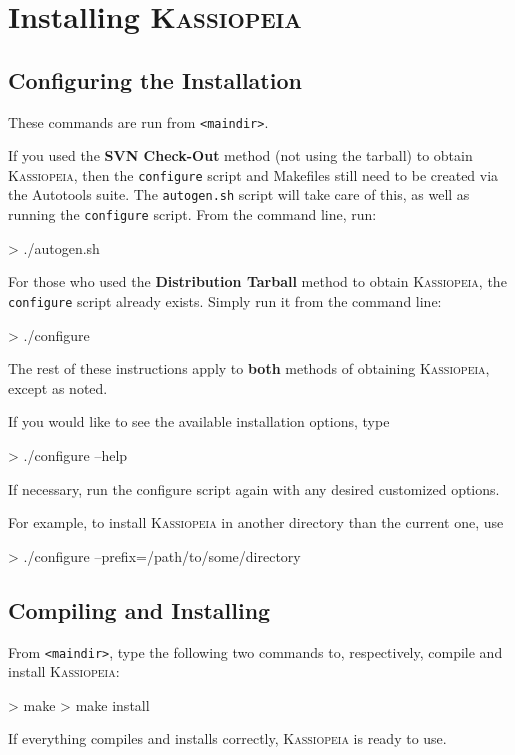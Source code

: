 \section{Installing \textsc{Kassiopeia}}

\subsection{Configuring the Installation}
These commands are run from \texttt{<maindir>}.

If you used the \textbf{SVN Check-Out} method (not using the tarball) to obtain \textsc{Kassiopeia}, then the \texttt{configure} script and Makefiles still need to be created via the Autotools suite.  The \texttt{autogen.sh} script will take care of this, as well as running the \texttt{configure} script.  From the command line, run:
\begin{DoxyCode}
>  ./autogen.sh
\end{DoxyCode}

For those who used the \textbf{Distribution Tarball} method to obtain \textsc{Kassiopeia}, the \texttt{configure} script already exists.  Simply run it from the command line:
\begin{DoxyCode}
>  ./configure
\end{DoxyCode}

The rest of these instructions apply to \textbf{both} methods of obtaining \textsc{Kassiopeia}, except as noted.

If you would like to see the available installation options, type
\begin{DoxyCode}
>  ./configure --help
\end{DoxyCode}
If necessary, run the configure script again with any desired customized options.

For example, to install \textsc{Kassiopeia} in another directory than the current one, use 
\begin{DoxyCode}
 > ./configure --prefix=/path/to/some/directory
\end{DoxyCode}

\subsection{Compiling and Installing}

From \texttt{<maindir>}, type the following two commands to, respectively, compile and install \textsc{Kassiopeia}:
\begin{DoxyCode}
>  make
>  make install
\end{DoxyCode}
If everything compiles and installs correctly, \textsc{Kassiopeia} is ready to use.


